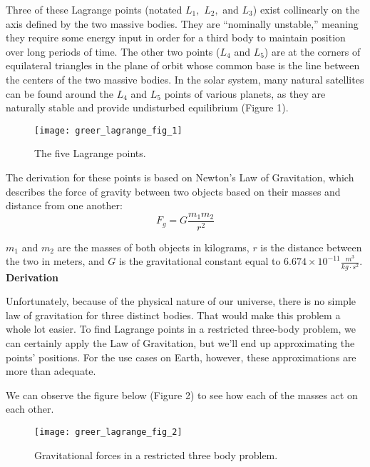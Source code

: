 Three of these Lagrange points (notated $L_1,$ $L_2,$ and $L_3$) exist collinearly on the axis defined by the two massive bodies. They are “nominally unstable,” meaning they require some energy input in order for a third body to maintain position over long periods of time. The other two points ($L_4$ and $L_5$) are at the corners of equilateral triangles in the plane of orbit whose common base is the line between the centers of the two massive bodies. In the solar system, many natural satellites can be found around the $L_4$ and $L_5$ points of various planets, as they are naturally stable and provide undisturbed equilibrium (Figure 1). 

\renewcommand{\thefigure}{1}
\begin{figure}[h]
  \begin{center}
    \texttt{[image: greer\_lagrange\_fig\_1]}
  \end{center}
  \caption{The five Lagrange points.}
  \label{fig:1}
\end{figure}

The derivation for these points is based on Newton’s Law of Gravitation, which describes the force of gravity between two objects based on their masses and distance from one another: \[F_g = G\frac{m_1m_2}{r^2}\]

$m_1$ and $m_2$ are the masses of both objects in kilograms, $r$ is the distance between the two in meters, and $G$ is the gravitational constant equal to $6.674\times{10^{-11}} \frac{m^3}{kg\cdot{}s^2}$.
\newline\newline
\textbf{Derivation}

Unfortunately, because of the physical nature of our universe, there is no simple law of gravitation for three distinct bodies. That would make this problem a whole lot easier. To find Lagrange points in a restricted three-body problem, we can certainly apply the Law of Gravitation, but we’ll end up approximating the points’ positions. For the use cases on Earth, however, these approximations are more than adequate. 

We can observe the figure below (Figure 2) to see how each of the masses act on each other. 

\renewcommand{\thefigure}{2}
\begin{figure}[h]
  \begin{center}
    \texttt{[image: greer\_lagrange\_fig\_2]}
  \end{center}
  \caption{Gravitational forces in a restricted three body problem.}
  \label{fig:2}
\end{figure}

